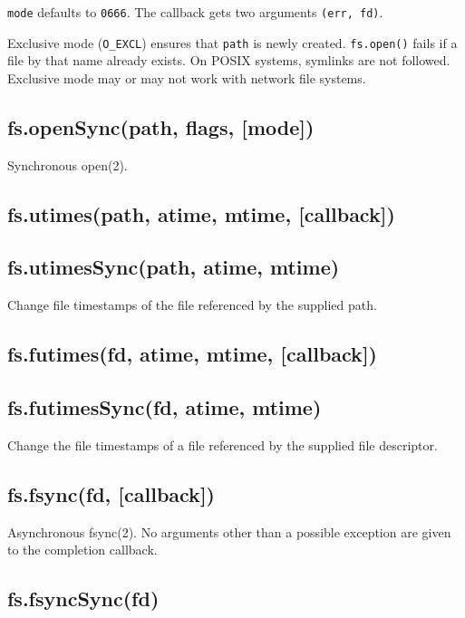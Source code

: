 \texttt{mode} defaults to \texttt{0666}. The callback gets two arguments
\texttt{(err, fd)}.

Exclusive mode (\texttt{O\_EXCL}) ensures that \texttt{path} is newly
created. \texttt{fs.open()} fails if a file by that name already exists.
On POSIX systems, symlinks are not followed. Exclusive mode may or may
not work with network file systems.

\subsection{fs.openSync(path, flags, {[}mode{]})}

Synchronous open(2).

\subsection{fs.utimes(path, atime, mtime, {[}callback{]})}

\subsection{fs.utimesSync(path, atime, mtime)}

Change file timestamps of the file referenced by the supplied path.

\subsection{fs.futimes(fd, atime, mtime, {[}callback{]})}

\subsection{fs.futimesSync(fd, atime, mtime)}

Change the file timestamps of a file referenced by the supplied file
descriptor.

\subsection{fs.fsync(fd, {[}callback{]})}

Asynchronous fsync(2). No arguments other than a possible exception are
given to the completion callback.

\subsection{fs.fsyncSync(fd)}


